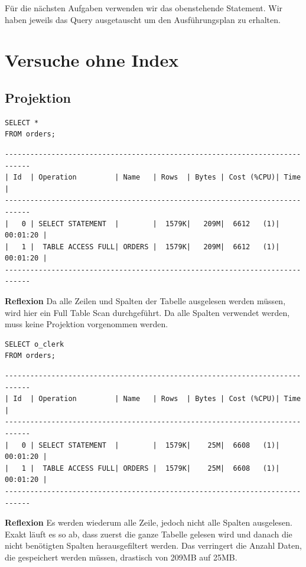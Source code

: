 \documentclass[10pt]{article}
\begin{document}
Für die nächsten Aufgaben verwenden wir das obenstehende Statement. Wir 
haben jeweils das Query ausgetauscht um den Ausführungsplan zu erhalten.

\newpage
\section{Versuche ohne Index}
\subsection{Projektion}
\begin{lstlisting}[style=sql]
SELECT *
FROM orders;
\end{lstlisting}
\begin{lstlisting}[style=queryexecutionplan]
----------------------------------------------------------------------------
| Id  | Operation         | Name   | Rows  | Bytes | Cost (%CPU)| Time     |
----------------------------------------------------------------------------
|   0 | SELECT STATEMENT  |        |  1579K|   209M|  6612   (1)| 00:01:20 |
|   1 |  TABLE ACCESS FULL| ORDERS |  1579K|   209M|  6612   (1)| 00:01:20 |
---------------------------------------------------------------------------- 
\end{lstlisting}   
\textbf{Reflexion} \newline
Da alle Zeilen und Spalten der Tabelle ausgelesen werden müssen, wird hier ein
Full Table Scan durchgeführt. Da alle Spalten verwendet werden, muss keine Projektion 
vorgenommen werden.

\begin{lstlisting}[style=sql]
SELECT o_clerk
FROM orders;
\end{lstlisting}
\begin{lstlisting}[style=queryexecutionplan]
----------------------------------------------------------------------------
| Id  | Operation         | Name   | Rows  | Bytes | Cost (%CPU)| Time     |
----------------------------------------------------------------------------
|   0 | SELECT STATEMENT  |        |  1579K|    25M|  6608   (1)| 00:01:20 |
|   1 |  TABLE ACCESS FULL| ORDERS |  1579K|    25M|  6608   (1)| 00:01:20 |
---------------------------------------------------------------------------- 
\end{lstlisting}   
\textbf{Reflexion} \newline
Es werden wiederum alle Zeile, jedoch nicht alle Spalten ausgelesen.
Exakt läuft es so ab, dass zuerst die ganze Tabelle gelesen wird und danach die nicht
benötigten Spalten herausgefiltert werden.
Das verringert die Anzahl Daten, die gespeichert werden müssen, drastisch von 209MB auf 25MB.
\end{document}

